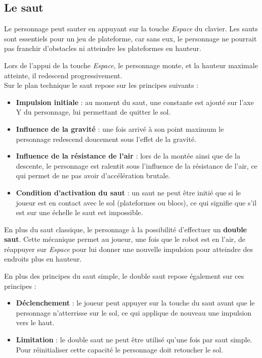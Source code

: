 \documentclass[10pt]{report}
\begin{document}
\subsection{Le saut}
Le personnage peut sauter en appuyant sur la touche \emph{Espace} du clavier. Les sauts sont essentiels pour un jeu de plateforme, car sans eux, le personnage ne pourrait pas franchir d'obstacles ni atteindre les plateformes en hauteur. 

Lors de l'appui de la touche \emph{Espace}, le personnage monte, et la hauteur maximale atteinte, il redescend progressivement. \\
Sur le plan technique le saut repose sur les principes suivants : 

\begin{itemize}
  \item \textbf{Impulsion initiale} : au moment du saut, une constante est ajouté sur l'axe Y du personnage, lui permettant de quitter le sol.
  \item \textbf{Influence de la gravité} : une fois arrivé à son point maximum le personnage redescend doucement sous l'effet de la gravité. 
  \item \textbf{Influence de la résistance de l'air} : lors de la montée ainsi que de la descente, le personnage est ralentit sous l'influence de la résistance de l'air, ce qui permet de ne pas avoir d'accélération brutale. 
  \item \textbf{Condition d'activation du saut} : un saut ne peut être initié que si le joueur est en contact avec le sol (plateformes ou blocs), ce qui signifie que s'il est sur une échelle le saut est impossible. 
\end{itemize}

En plus du saut classique, le personnage à la possibilité d'effectuer un \textbf{double saut}. Cette mécanique permet au joueur, une fois que le robot est en l'air, de réappuyer sur \emph{Espace} pour lui donner une nouvelle impulsion pour atteindre des endroits plus en hauteur. 

En plus des principes du saut simple, le double saut repose également sur ces principes :

\begin{itemize}
  \item \textbf{Déclenchement} : le joueur peut appuyer sur la touche du saut avant que le personnage n'atterrisse sur le sol, ce qui applique de nouveau une impulsion vers le haut.
  \item \textbf{Limitation} : le double saut ne peut être utilisé qu'une fois par saut simple. Pour réinitialiser cette capacité le personnage doit retoucher le sol.
\end{itemize}
\end{document}
